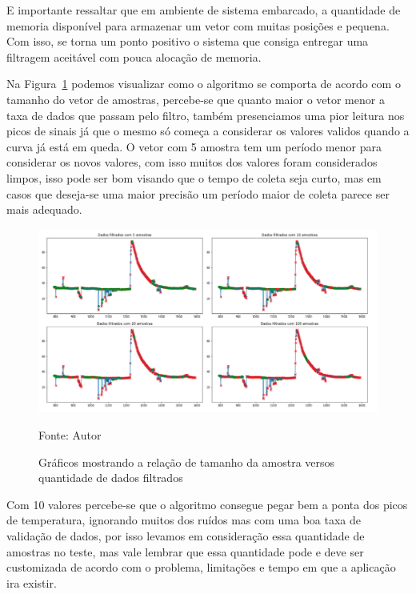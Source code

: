 E importante ressaltar que em ambiente de sistema embarcado, a quantidade de memoria disponível para armazenar um vetor com muitas posições e pequena. Com isso, se torna um ponto positivo o sistema que consiga entregar uma filtragem aceitável com pouca alocação de memoria. 

Na Figura~\ref{fig: graficos_tamanhos_amostras} podemos visualizar como o algoritmo se comporta de acordo com o tamanho do vetor de amostras, percebe-se que quanto maior o vetor menor a taxa de dados que passam pelo filtro, também presenciamos uma pior leitura nos picos de sinais já que o mesmo só começa a considerar os valores validos quando a curva já está em queda. O vetor com 5 amostra tem um período menor para considerar os novos valores, com isso muitos dos valores foram considerados limpos, isso pode ser bom visando que o tempo de coleta seja curto, mas em casos que deseja-se uma maior precisão um período maior de coleta parece ser mais adequado. 


\begin{figure}[H]
	\centering
	\includegraphics[width=15cm]{imagens/sensores/graficos_tamanhos_amostras.jpg}
	\caption{Gráficos mostrando a relação de tamanho da amostra versos quantidade de dados filtrados}
	Fonte: Autor
	\label{fig: graficos_tamanhos_amostras}
\end{figure}

Com 10 valores percebe-se que o algoritmo consegue pegar bem a ponta dos picos de temperatura, ignorando muitos dos ruídos mas com uma boa taxa de validação de dados, por isso levamos em consideração essa quantidade de amostras no teste, mas vale lembrar que essa quantidade pode e deve ser customizada de acordo com o problema, limitações e tempo em que a aplicação ira existir.

